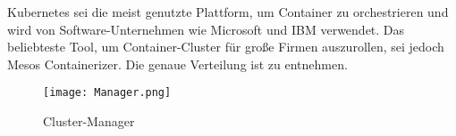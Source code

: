 \newpage
Kubernetes sei die meist genutzte Plattform, um Container zu orchestrieren und wird von Software-Unternehmen wie Microsoft und IBM verwendet. Das beliebteste Tool, um Container-Cluster für große Firmen auszurollen, sei jedoch Mesos Containerizer. \cite{stats} Die genaue Verteilung ist  zu entnehmen.
\begin{figure}[H]
	\begin{center}
		\texttt{[image: Manager.png]}
	\end{center}
	\caption[Cluster-Manager]{Cluster-Manager \footnotemark}
	\label{fig:Stats4}
\end{figure}

